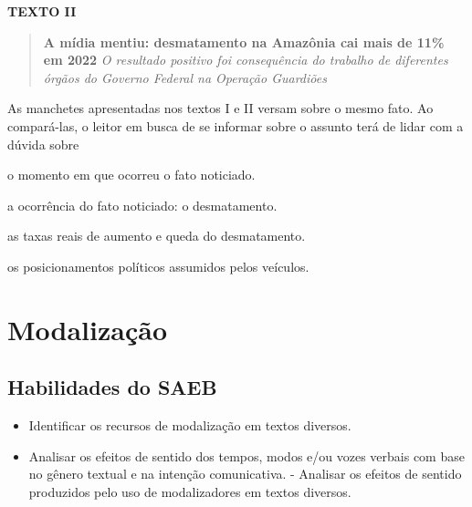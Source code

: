 
\textbf{TEXTO II}

\begin{quote}
\textbf{A mídia mentiu: desmatamento na Amazônia cai mais de 11\% em
2022} \emph{O resultado positivo foi consequência do trabalho de
diferentes órgãos do Governo Federal na Operação Guardiões}
\end{quote}


As manchetes apresentadas nos textos I e II versam sobre o mesmo fato.
Ao compará-las, o leitor em busca de se informar sobre o assunto terá de
lidar com a dúvida sobre

\begin{escolha}
\item o momento em que ocorreu o fato noticiado.

\item a ocorrência do fato noticiado: o desmatamento.

\item as taxas reais de aumento e queda do desmatamento.

\item os posicionamentos políticos assumidos pelos veículos.
\end{escolha}

\chapter{Modalização}

\section{Habilidades do SAEB} 

\begin{itemize}
  \item Identificar os recursos de modalização
em textos diversos. 
\item Analisar os efeitos de sentido dos tempos, modos
e/ou vozes verbais com base no gênero textual e na intenção
comunicativa. - Analisar os efeitos de sentido produzidos pelo uso de
modalizadores em textos diversos.
\end{itemize}


